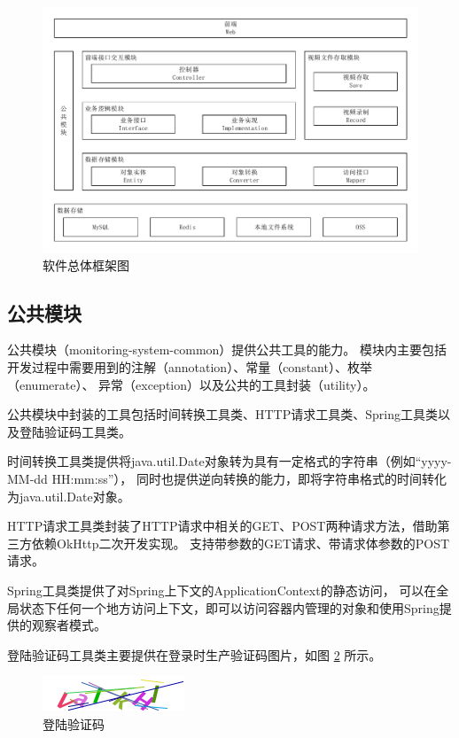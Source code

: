 \begin{figure}[ht]
    \centering
    \includegraphics[scale=.7]{./Figure/IMG_struct.pdf}
    \caption{软件总体框架图}\label{Fig:struct}
\end{figure}

\subsection{公共模块}
公共模块（monitoring-system-common）提供公共工具的能力。
模块内主要包括开发过程中需要用到的注解（annotation）、常量（constant）、枚举（enumerate）、
异常（exception）以及公共的工具封装（utility）。

公共模块中封装的工具包括时间转换工具类、HTTP请求工具类、Spring工具类以及登陆验证码工具类。

时间转换工具类提供将java.util.Date对象转为具有一定格式的字符串（例如“yyyy-MM-dd HH:mm:ss”），
同时也提供逆向转换的能力，即将字符串格式的时间转化为java.util.Date对象。

HTTP请求工具类封装了HTTP请求中相关的GET、POST两种请求方法，借助第三方依赖OkHttp二次开发实现。
支持带参数的GET请求、带请求体参数的POST请求。

Spring工具类提供了对Spring上下文的ApplicationContext的静态访问，
可以在全局状态下任何一个地方访问上下文，即可以访问容器内管理的对象和使用Spring提供的观察者模式。

登陆验证码工具类主要提供在登录时生产验证码图片，如图 \ref{Fig:code} 所示。

\begin{figure}[ht]
    \centering
    \includegraphics[width=0.5\linewidth]{./Figure/IMG_code.png}
    \caption{登陆验证码}\label{Fig:code}
\end{figure}

